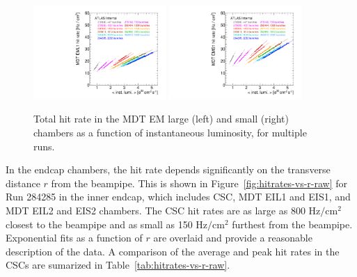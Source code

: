 \begin{figure}
  \begin{center}
    \includegraphics[width=0.45\textwidth]{./figures/rate_raw_vs_lumi_vs_evts_mdt_EML1_overlay.pdf}
    \includegraphics[width=0.45\textwidth]{./figures/rate_raw_vs_lumi_vs_evts_mdt_EMS1_overlay.pdf}
    \caption{Total hit rate in the MDT EM large (left) and small (right) chambers as a function of instantaneous luminosity, for multiple runs.}
    \label{fig:hitrates-vs-lumi-mdt-em1-raw}
  \end{center}
\end{figure}

In the endcap chambers, the hit rate depends significantly on the transverse distance $r$ from the beampipe. This is shown in Figure~\ref{fig:hitrates-vs-r-raw} for Run 284285 in the inner endcap, which includes CSC, MDT EIL1 and EIS1, and MDT EIL2 and EIS2 chambers. The CSC hit rates are as large as 800 $\text{Hz} / \text{cm}^2$ closest to the beampipe and as small as 150 $\text{Hz} / \text{cm}^2$ furthest from the beampipe. Exponential fits as a function of $r$ are overlaid and provide a reasonable description of the data. A comparison of the average and peak hit rates in the CSCs are sumarized in Table~\ref{tab:hitrates-vs-r-raw}.

